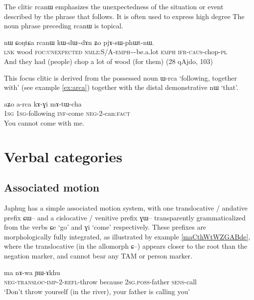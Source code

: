 \documentclass[oldfontcommands,oneside,a4paper,11pt]{article}
\newcommand{\ipa}[1]{{\phon #1}} %
\begin{document}
 
The clitic \ipa{rcanɯ} emphasizes the unexpectedness of the situation or event described by the phrase that follows. It is often used to express high degree
The noun phrase preceding \ipa{rcanɯ} is topical.
\begin{exe}
\ex
\gll \ipa{tɕe} 	\ipa{nɯ} 	\ipa{ɕoŋtɕa} 	\ipa{rcanɯ} 	\ipa{kɯ-dɯ\textasciitilde{}dɤn} 	\ipa{ʑo} 	\ipa{pjɤ-sɯ-phɯt-nɯ.} \\
\textsc{lnk} wood \textsc{foc:unexpected} \textsc{nmlz}:S/A-\textsc{emph}\textasciitilde{}-be.a.lot \textsc{emph} \textsc{ifr-caus}-chop-\textsc{pl}\\
\glt And they had (people) chop a lot of wood (for them) (28 qAjdo,  103)
\end{exe}

This focus clitic is derived from the possessed noun  \ipa{ɯ-rca} `following, together with' (see example \ref{ex:arca}) together with the distal demonstrative \ipa{nɯ} `that'.
\begin{exe}
\ex \label{ex:arca}
\gll
\ipa{aʑo} 	\ipa{a-rca} 	\ipa{kɤ-ɣi} 	\ipa{mɤ-tɯ-cha} \\
\textsc{1sg} \textsc{1sg}-following \textsc{inf}-come \textsc{neg}-2-can:\textsc{fact} \\
\glt You cannot come with me.
\end{exe}
 

  \section{Verbal categories} 

\subsection{Associated motion}
Japhug has a simple associated motion system, with one translocative / andative prefix \ipa{ɕɯ--} and a cislocative / venitive prefix \ipa{ɣɯ--} transparently grammaticalized from the verbs \ipa{ɕe} `go' and \ipa{ɣi} `come' respectively. These prefixes are morphologically fully integrated, as illustrated by example \ref{maCthWtWZGABde}, where the translocative (in the allomorph \ipa{ɕ--}) appears closer to the root than the negation marker, and cannot bear any TAM or person marker.

\begin{exe}
\ex \label{maCthWtWZGABde}
\gll \ipa{ma-ɕ-thɯ-tɯ-ʑɣɤ-βde} 	\ipa{ma} 	\ipa{nɤ-wa} 	\ipa{ɲɯ-ɤkhu}   \\
\textsc{neg-transloc-imp-2-refl}-throw because \textsc{2sg.poss}-father \textsc{sens}-call \\
\glt `Don't throw yourself (in the river), your father is calling you' 
\end{exe}
\end{document}
